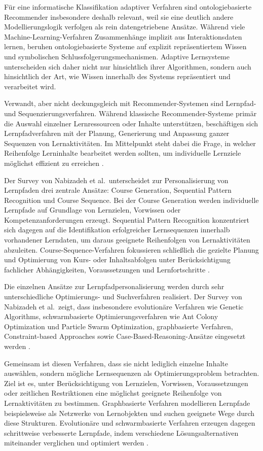 Für eine informatische Klassifikation adaptiver Verfahren sind
ontologiebasierte Recommender insbesondere deshalb relevant, weil sie
eine deutlich andere Modellierungslogik verfolgen als rein
datengetriebene Ansätze. Während viele Machine-Learning-Verfahren
Zusammenhänge implizit aus Interaktionsdaten lernen, beruhen
ontologiebasierte Systeme auf explizit repräsentiertem Wissen und
symbolischen Schlussfolgerungsmechanismen. Adaptive Lernsysteme
unterscheiden sich daher nicht nur hinsichtlich ihrer Algorithmen,
sondern auch hinsichtlich der Art, wie Wissen innerhalb des Systems
repräsentiert und verarbeitet wird.

Verwandt, aber nicht deckungsgleich mit Recommender-Systemen sind
Lernpfad- und Sequenzierungsverfahren. Während klassische
Recommender-Systeme primär die Auswahl einzelner Lernressourcen oder
Inhalte unterstützen, beschäftigen sich Lernpfadverfahren mit der
Planung, Generierung und Anpassung ganzer Sequenzen von Lernaktivitäten.
Im Mittelpunkt steht dabei die Frage, in welcher Reihenfolge Lerninhalte
bearbeitet werden sollten, um individuelle Lernziele möglichst effizient
zu erreichen \citep{Nabizadeh2020}.

Der Survey von Nabizadeh et al.~unterscheidet zur Personalisierung von
Lernpfaden drei zentrale Ansätze: Course Generation, Sequential Pattern
Recognition und Course Sequence. Bei der Course Generation werden
individuelle Lernpfade auf Grundlage von Lernzielen, Vorwissen oder
Kompetenzanforderungen erzeugt. Sequential Pattern Recognition
konzentriert sich dagegen auf die Identifikation erfolgreicher
Lernsequenzen innerhalb vorhandener Lerndaten, um daraus geeignete
Reihenfolgen von Lernaktivitäten abzuleiten. Course-Sequence-Verfahren
fokussieren schließlich die gezielte Planung und Optimierung von Kurs-
oder Inhaltsabfolgen unter Berücksichtigung fachlicher Abhängigkeiten,
Voraussetzungen und Lernfortschritte \citep{Nabizadeh2020}.

Die einzelnen Ansätze zur Lernpfadpersonalisierung werden durch sehr
unterschiedliche Optimierungs- und Suchverfahren realisiert. Der Survey
von Nabizadeh et al.~zeigt, dass insbesondere evolutionäre Verfahren wie
Genetic Algorithms, schwarmbasierte Optimierungsverfahren wie Ant Colony
Optimization und Particle Swarm Optimization, graphbasierte Verfahren,
Constraint-based Approaches sowie Case-Based-Reasoning-Ansätze
eingesetzt werden \citep{Nabizadeh2020}.

Gemeinsam ist diesen Verfahren, dass sie nicht lediglich einzelne
Inhalte auswählen, sondern mögliche Lernsequenzen als
Optimierungsproblem betrachten. Ziel ist es, unter Berücksichtigung von
Lernzielen, Vorwissen, Voraussetzungen oder zeitlichen Restriktionen
eine möglichst geeignete Reihenfolge von Lernaktivitäten zu bestimmen.
Graphbasierte Verfahren modellieren Lernpfade beispielsweise als
Netzwerke von Lernobjekten und suchen geeignete Wege durch diese
Strukturen. Evolutionäre und schwarmbasierte Verfahren erzeugen dagegen
schrittweise verbesserte Lernpfade, indem verschiedene
Lösungsalternativen miteinander verglichen und optimiert werden
\citep{Nabizadeh2020}.

